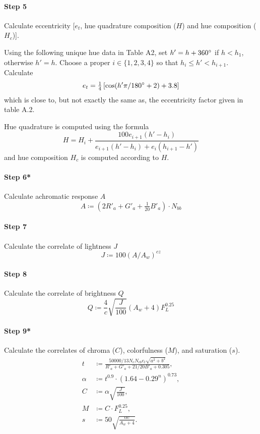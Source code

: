 \documentclass[twocolumn]{scrartcl}
\theoremstyle{named}
\begin{document}
\paragraph{Step 5}{%
  Calculate eccentricity [$e_t$, hue quadrature composition
($H$) and hue composition ($H_c$)].

Using the following unique hue data in Table A2, set
$h'= h + 360\degree$ if $h < h_1$, otherwise $h'=h$.
Choose a proper $i\in\{1,2,3,4\}$ so that $h_i\le h' < h_{i+1}$.
Calculate
\[
  e_t = \tfrac{1}{4}
  \left[
    \cos(h'\pi/180\degree + 2) + 3.8
  \right]
\]
which is close to, but not exactly the same as, the eccentricity factor given
in table A.2.

Hue quadrature is computed using the formula
\[
  H = H_i + \frac{100 e_{i+1} (h'-h_i)}{e_{i+1}(h'-h_i) + e_i (h_{i+1}-h')}
  \]
and hue composition $H_c$ is computed according to $H$. %
  }

\paragraph{Step 6*}{%
Calculate achromatic response $A$
\[
  A\coloneqq (2 R'_a + G'_a + \tfrac{1}{20} B'_a) \cdot N_{bb}
  \]
}

\paragraph{Step 7}{%
Calculate the correlate of lightness $J$
\[
  J \coloneqq 100 {(A / A_w)}^{cz}
  \]
}

\paragraph{Step 8}{%
  Calculate the correlate of brightness $Q$
  \[
    Q \coloneqq \frac{4}{c} \sqrt{\frac{J}{100}} (A_w+4) F_L^{0.25}
    \]
  }

\paragraph{Step 9*}{%
Calculate the correlates of chroma ($C$), colorfulness
($M$), and saturation ($s$).
\begin{align*}
  t&\coloneqq \frac{50000/13 N_c N_{cb} e_t \sqrt{a^2 + b^2}}{R'_a + G'_a + 21/20 B'_a + 0.305},\\
  \alpha&\coloneqq t^{0.9} \cdot {(1.64 - 0.29^n)}^{0.73},\\
  C&\coloneqq \alpha \sqrt{\frac{J}{100}},\\
  M&\coloneqq C\cdot F_L^{0.25},\\
  s &\coloneqq 50 \sqrt{\frac{\alpha c}{A_w + 4}}.
\end{align*}
  }
\end{document}
